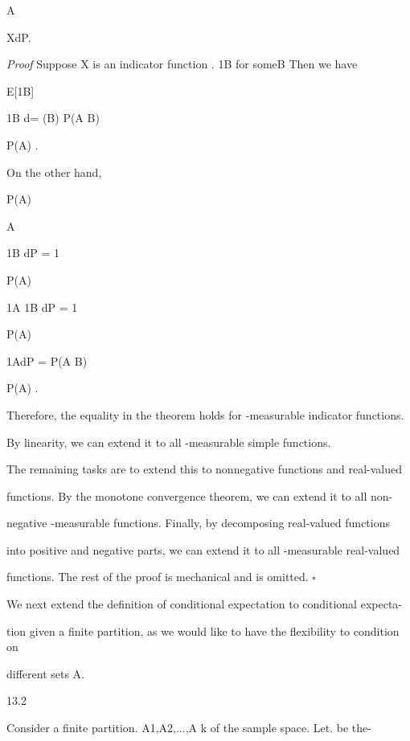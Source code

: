 \int

A

XdP.

\textit{Proof} Suppose X is an indicator function . 1B for someB \in{}Then we have

E[1B\vertA] \coloneqq

\int

\Omega

1B d\muA = \muA(B) \coloneqq P(A \cap B)

P(A) .

On the other hand,

P(A)

\int

A

1B dP = 1

P(A)

\int

\Omega

1A 1B dP = 1

P(A)

\int

\Omega

1A\capB dP = P(A \cap B)

P(A) .

Therefore, the equality in the theorem holds for -measurable indicator functions.

By linearity, we can extend it to all -measurable simple functions.

The remaining tasks are to extend this to nonnegative functions and real-valued

functions. By the monotone convergence theorem, we can extend it to all non-

negative -measurable functions. Finally, by decomposing real-valued functions

into positive and negative parts, we can extend it to all -measurable real-valued

functions. The rest of the proof is mechanical and is omitted. \hfill $\square$

We next extend the definition of conditional expectation to conditional expecta-

tion given a finite partition, as we would like to have the flexibility to condition on

different sets A.

\begin{defbox}{13.2}
\end{defbox}

Consider a finite partition. A1,A2,...,A k of the sample space. \Omega Let. be the\sigma-

